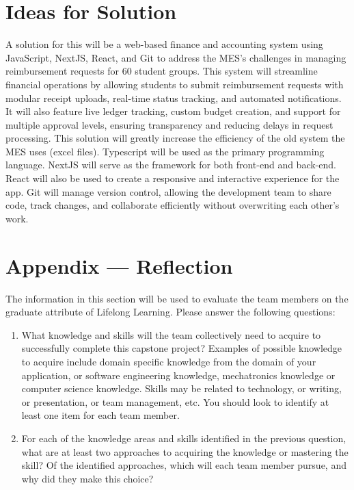 \documentclass[12pt]{article}
\begin{document}
\section{Ideas for Solution}
A solution for this will be a web-based finance and accounting system using JavaScript, NextJS, React, and Git to address the MES's challenges in managing reimbursement requests for 60 student groups. This system will streamline financial operations by allowing students to submit reimbursement requests with modular receipt uploads, real-time status tracking, and automated notifications. It will also feature live ledger tracking, custom budget creation, and support for multiple approval levels, ensuring transparency and reducing delays in request processing. This solution will greatly increase the efficiency of the old system the MES uses (excel files). Typescript will be used as the primary programming language. NextJS will serve as the framework for both front-end and back-end. React will also be used to create a responsive and interactive experience for the app. Git will manage version control, allowing the development team to share code, track changes, and collaborate efficiently without overwriting each other’s work. 
\newpage{}
\section*{Appendix --- Reflection}

The information in this section will be used to evaluate the team members on the
graduate attribute of Lifelong Learning.  Please answer the following questions:

\begin{enumerate}
  \item What knowledge and skills will the team collectively need to acquire to
  successfully complete this capstone project?  Examples of possible knowledge
  to acquire include domain specific knowledge from the domain of your
  application, or software engineering knowledge, mechatronics knowledge or
  computer science knowledge.  Skills may be related to technology, or writing,
  or presentation, or team management, etc.  You should look to identify at
  least one item for each team member.
  \item For each of the knowledge areas and skills identified in the previous
  question, what are at least two approaches to acquiring the knowledge or
  mastering the skill?  Of the identified approaches, which will each team
  member pursue, and why did they make this choice?
\end{enumerate}
\end{document}
